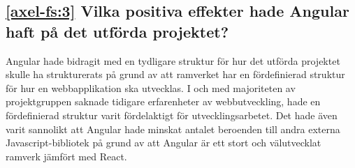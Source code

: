 \subsection*{\ref{axel-fs:3} Vilka positiva effekter hade Angular haft på det utförda projektet?}
Angular hade bidragit med en tydligare struktur för hur det utförda projektet skulle ha strukturerats på grund av att ramverket har en fördefinierad struktur för hur en webbapplikation ska utvecklas. I och med majoriteten av projektgruppen saknade tidigare erfarenheter av webbutveckling, hade en fördefinierad struktur varit fördelaktigt för utvecklingsarbetet. Det hade även varit sannolikt att Angular hade minskat antalet beroenden till andra externa Javascript-bibliotek på grund av att Angular är ett stort och välutvecklat ramverk jämfört med React. 




